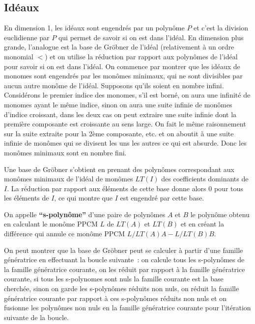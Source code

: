 \documentclass[a4paper,11pt]{book}
\begin{document}
\begin{giacjshere}
\section{Idéaux}
En dimension 1, les idéaux sont engendrés par un polynôme $P$ et
c'est la division euclidienne par $P$ qui permet de savoir si on est
dans l'idéal. En dimension plus grande, l'analogue est la base
de Gröbner de l'idéal (relativement à un ordre monomial $<$)
et on utilise la réduction par rapport aux polynômes de l'idéal
pour savoir si on est dans l'idéal.
On commence par montrer que les idéaux de monomes
sont engendrés par 
les monômes minimaux, qui ne sont divisibles par aucun
autre monôme de l'idéal. Supposons qu'ils soient en nombre infini.
Considérons le premier indice des monomes, s'il est borné, on 
aura une infinité de monomes ayant le même indice, sinon on
aura une suite infinie de monômes d'indice croissant, dans
les deux cas on peut extraire une suite infinie dont la première
composante est croissante au sens large. On fait le même
raisonnement sur la suite extraite pour la 2ème composante, etc.
et on aboutit à une suite infinie de monômes qui se divisent les
uns les autres ce qui est absurde. Donc les monômes minimaux
sont en nombre fini.

Une base de Gröbner s'obtient en prenant
des polynômes correspondant aux monômes minimaux 
de l'idéal de monômes $LT(I)$ 
des coefficients dominants de $I$. La réduction
par rapport aux éléments de cette base donne alors 0
pour tous les éléments de $I$, ce qui montre que
$I$ est engendré par cette base.

On appelle {\bf ``s-polynôme''} d'une paire de polynômes
$A$ et $B$
le polynôme obtenu en calculant le monôme PPCM $L$ de $LT(A)$ 
et $LT(B)$ et en créant la différence
qui annule ce monôme PPCM $L/LT(A)A -L/LT(B)B$.

On peut montrer que la base de Gröbner peut se calculer
à partir d'une famille génératrice en effectuant
la boucle suivante~:
on calcule tous les s-polynômes de la famille génératrice
courante, on les réduit par rapport à la famille génératrice
courante, si tous les s-polynomes sont nuls la famille
courante est la base cherchée, sinon 
on garde les s-polynômes réduits non nuls, on réduit
la famille génératrice courante par rapport à ces s-polynômes réduits
non nuls et on fusionne les polynômes non nuls en la famille
génératrice courante pour l'itération suivante de la boucle.


\end{giacjshere}
\end{document}
